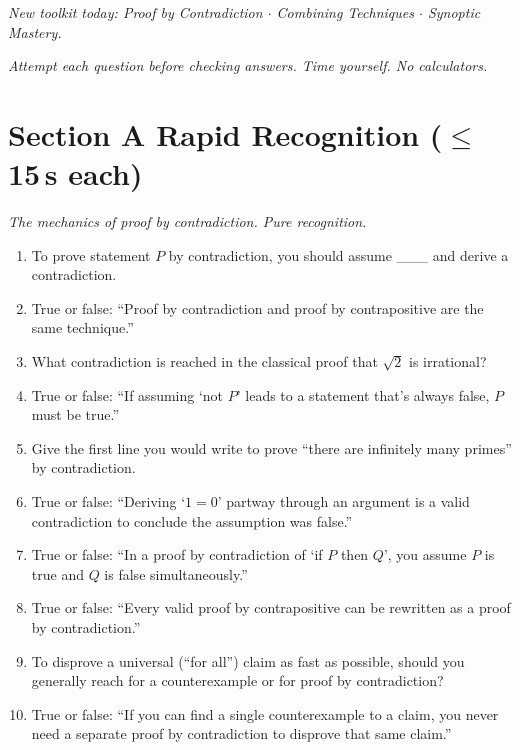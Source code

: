 \documentclass[11pt,a4paper]{article}
\begin{document}
\noindent\textit{New toolkit today: Proof by Contradiction $\cdot$ Combining Techniques $\cdot$ Synoptic Mastery.}

\vspace{2pt}
\noindent\textit{Attempt each question before checking answers. Time yourself. No calculators.}

\section*{Section A \quad Rapid Recognition \hfill{\normalfont\small($\leq$15\,s each)}}

\noindent\textit{The mechanics of proof by contradiction. Pure recognition.}

\begin{enumerate}

\item To prove statement $P$ by contradiction, you should assume \_\_\_ and derive a contradiction.

\item True or false: ``Proof by contradiction and proof by contrapositive are the same technique.''

\item What contradiction is reached in the classical proof that $\sqrt2$ is irrational?

\item True or false: ``If assuming `not $P$' leads to a statement that's always false, $P$ must be true.''

\item Give the first line you would write to prove ``there are infinitely many primes'' by contradiction.

\item True or false: ``Deriving `$1=0$' partway through an argument is a valid contradiction to conclude the assumption was false.''

\item True or false: ``In a proof by contradiction of `if $P$ then $Q$', you assume $P$ is true and $Q$ is false simultaneously.''

\item True or false: ``Every valid proof by contrapositive can be rewritten as a proof by contradiction.''

\item To disprove a universal (``for all'') claim as fast as possible, should you generally reach for a counterexample or for proof by contradiction?

\item True or false: ``If you can find a single counterexample to a claim, you never need a separate proof by contradiction to disprove that same claim.''

\end{enumerate}
\end{document}
